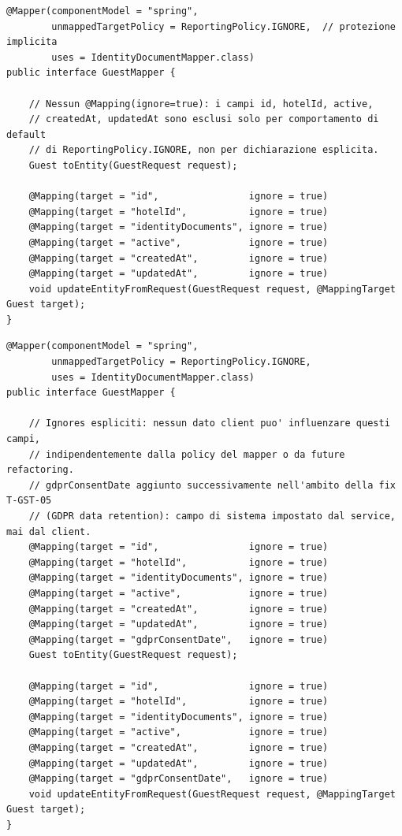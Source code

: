 ﻿\documentclass[a4paper,12pt]{report}
\begin{document}
\begin{insecurebox}[title={Codice Vulnerabile --- GuestMapper.java (baseline)}]
\begin{lstlisting}[style=java]
@Mapper(componentModel = "spring",
        unmappedTargetPolicy = ReportingPolicy.IGNORE,  // protezione implicita
        uses = IdentityDocumentMapper.class)
public interface GuestMapper {

    // Nessun @Mapping(ignore=true): i campi id, hotelId, active,
    // createdAt, updatedAt sono esclusi solo per comportamento di default
    // di ReportingPolicy.IGNORE, non per dichiarazione esplicita.
    Guest toEntity(GuestRequest request);

    @Mapping(target = "id",                ignore = true)
    @Mapping(target = "hotelId",           ignore = true)
    @Mapping(target = "identityDocuments", ignore = true)
    @Mapping(target = "active",            ignore = true)
    @Mapping(target = "createdAt",         ignore = true)
    @Mapping(target = "updatedAt",         ignore = true)
    void updateEntityFromRequest(GuestRequest request, @MappingTarget Guest target);
}
\end{lstlisting}
\end{insecurebox}

\begin{securebox}[title={Codice Sicuro --- GuestMapper.java}]
\begin{lstlisting}[style=java]
@Mapper(componentModel = "spring",
        unmappedTargetPolicy = ReportingPolicy.IGNORE,
        uses = IdentityDocumentMapper.class)
public interface GuestMapper {

    // Ignores espliciti: nessun dato client puo' influenzare questi campi,
    // indipendentemente dalla policy del mapper o da future refactoring.
    // gdprConsentDate aggiunto successivamente nell'ambito della fix T-GST-05
    // (GDPR data retention): campo di sistema impostato dal service, mai dal client.
    @Mapping(target = "id",                ignore = true)
    @Mapping(target = "hotelId",           ignore = true)
    @Mapping(target = "identityDocuments", ignore = true)
    @Mapping(target = "active",            ignore = true)
    @Mapping(target = "createdAt",         ignore = true)
    @Mapping(target = "updatedAt",         ignore = true)
    @Mapping(target = "gdprConsentDate",   ignore = true)
    Guest toEntity(GuestRequest request);

    @Mapping(target = "id",                ignore = true)
    @Mapping(target = "hotelId",           ignore = true)
    @Mapping(target = "identityDocuments", ignore = true)
    @Mapping(target = "active",            ignore = true)
    @Mapping(target = "createdAt",         ignore = true)
    @Mapping(target = "updatedAt",         ignore = true)
    @Mapping(target = "gdprConsentDate",   ignore = true)
    void updateEntityFromRequest(GuestRequest request, @MappingTarget Guest target);
}
\end{lstlisting}
\end{securebox}
\end{document}
